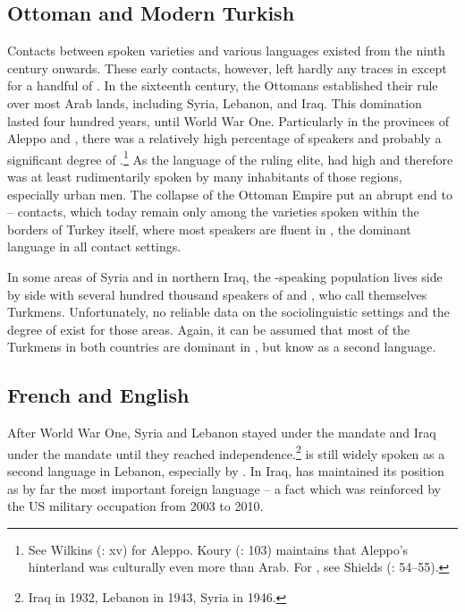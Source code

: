 \documentclass[output=paper]{langsci/langscibook}
\begin{document}
 \subsection{Ottoman and Modern Turkish} 
Contacts between spoken  varieties and various  languages existed from the ninth century onwards. These early contacts, however, left hardly any traces in  except for a handful of . In the sixteenth century, the Ottomans established their rule over most Arab lands, including Syria, Lebanon, and Iraq. This domination lasted four hundred years, until World War One. Particularly in the provinces of Aleppo and , there was a relatively high percentage of  speakers and probably a significant degree of .\footnote{See Wilkins (\citeyear{Wilkins2010}: xv) for Aleppo. Koury (\citeyear{Khoury1987}: 103) maintains that Aleppo’s hinterland was culturally even more  than Arab. For , see Shields (\citeyear{Shields2004}: 54--55).} As the language of the ruling elite,  had high  and therefore was at least rudimentarily spoken by many inhabitants of those regions, especially urban men. The collapse of the Ottoman Empire put an abrupt end to -- contacts, which today remain  only among the  varieties spoken within the borders of Turkey itself, where most  speakers are fluent in , the dominant language in all contact settings.

In some areas of Syria and in northern Iraq, the -speaking population lives side by side with several hundred thousand speakers of  and  , who call themselves Turkmens. Unfortunately, no reliable data on the sociolinguistic settings and the degree of  exist for those areas. Again, it can be assumed that most of the Turkmens in both countries are dominant in , but know  as a second language.

 \subsection{French and English} \label{french}

After World War One, Syria and Lebanon stayed under the  mandate and Iraq under the  mandate until they reached independence.\footnote{Iraq in 1932, Lebanon in 1943, Syria in 1946.}  is still widely spoken as a second language in Lebanon, especially by . In Iraq,  has maintained its position as by far the most important foreign language – a fact which was reinforced by the US military occupation from 2003 to 2010. 
\end{document}
